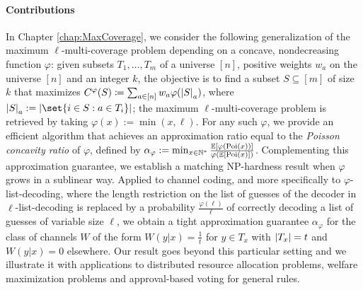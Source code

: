 \paragraph{Contributions} In Chapter \ref{chap:MaxCoverage}, we consider the following generalization of the maximum $\ell$-multi-coverage problem depending on a concave, nondecreasing function $\varphi$: given subsets $T_1, \ldots, T_m$ of a universe $[n]$, positive weights $w_a$ on the universe $[n]$ and an integer $k$, the objective is to find a subset $S \subseteq [m]$ of size $k$ that maximizes $C^{\varphi}(S) \coloneqq \sum_{a \in [n]}w_a\varphi(\abs{S}_a)$, where $\abs{S}_a := \abs{\set{i \in S : a \in T_i}}$; the maximum $\ell$-multi-coverage problem is retrieved by taking $\varphi(x) := \min(x,\ell)$. For any such $\varphi$, we provide an efficient algorithm that achieves an approximation ratio equal to the \emph{Poisson concavity ratio} of $\varphi$, defined by $\alpha_{\varphi} := \min_{x \in \mathbb{N}^*} \frac{\mathbb{E}[\varphi(\operatorname{\text{Poi}}(x))]}{\varphi(\mathbb{E}[\operatorname{\text{Poi}}(x)])}$. Complementing this approximation guarantee, we establish a matching \textrm{NP}-hardness result when $\varphi$ grows in a sublinear way. Applied to channel coding, and more specifically to $\varphi$-list-decoding, where the length restriction on the list of guesses of the decoder in $\ell$-list-decoding is replaced by a probability $\frac{\varphi(\ell)}{\ell}$ of correctly decoding a list of guesses of variable size $\ell$, we obtain a tight approximation guarantee $\alpha_{\varphi}$ for the class of channels $W$ of the form $W(y|x) = \frac{1}{t}$ for $y \in T_x$ with $\abs{T_x}=t$ and $W(y|x) = 0$ elsewhere. Our result goes beyond this particular setting and we illustrate it with applications to distributed resource allocation problems, welfare maximization problems and approval-based voting for general rules.

